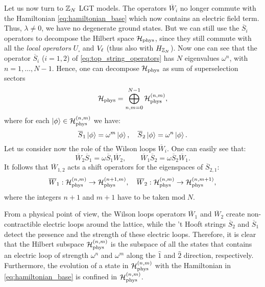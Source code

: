 Let us now turn to $\mathbb{Z}_N$ LGT models.
The operators $\overline{W}_i$ no longer commute with the Hamiltonian \eqref{eq:hamiltonian_base} which now contains an electric field term.
Thus, $\lambda \neq 0$, we have no degenerate ground states.
But we can still use the $\overline{S}_i$ operators to decompose the Hilbert space $\mathcal{H}_{\text{phys}}$, since they still commute with all the \emph{local operators} $U_{\square}$ and $V_{\ell}$ (thus also with $H_{\mathbb{Z}_N}$).
Now one can see that the operator $\overline{S}_i$ ($i=1,2$) of \eqref{eq:top_string_operators} has $N$ eigenvalues $\omega^n$, with $n=1, \dots, N-1$.
Hence, one can decompose $\mathcal{H}_{\text{phys}}$ as sum of superselection sectors
\begin{equation}
    \mathcal{H}_{\text{phys}} = \bigoplus_{n, m=0}^{N-1} \mathcal{H}_{\text{phys}}^{(n, m)},
    \label{eq:decomposizione_Hphys}
\end{equation}
where for each $\ket{\phi} \in \mathcal{H}_{\text{phys}}^{(n, m)}$ we have:
\begin{equation}
    \overline{S}_1 \ket{\phi} = \omega^{m}\ket{\phi}, \quad
    \overline{S}_2 \ket{\phi} = \omega^{n}\ket{\phi}.
\end{equation}
Let us consider now the role of the Wilson loops $\overline{W}_i$.
One can easily see that:
\begin{equation}
    \overline{W}_2 \overline{S}_1 = \omega \overline{S}_1 \overline{W}_2, \qquad
    \overline{W}_1 \overline{S}_2 = \omega \overline{S}_2 \overline{W}_1.
    \label{eq:algebra_op_nonlocali}
\end{equation}
It follows that $\overline{W}_{1,2}$ acts a shift operators for the eigenspaces of $\overline{S}_{2,1}$:
\begin{equation}
    \overline{W}_1 : \mathcal{H}_{\text{phys}}^{(n, m)} \to \mathcal{H}_{\text{phys}}^{(n + 1, m)}, \quad
    \overline{W}_2 : \mathcal{H}_{\text{phys}}^{(n, m)} \to \mathcal{H}_{\text{phys}}^{(n, m + 1)},
    \label{eq:azione_wilson_loop}
\end{equation}
where the integers $n + 1$ and $m + 1$ have to be taken $\mathrm{mod}\; N$.

From a physical point of view, the Wilson loops operators $\overline{W}_1$ and $\overline{W}_2$ create non-contractible electric loops around the lattice, while  the 't Hooft strings $\overline{S}_2$ and $\overline{S}_1$ detect the presence and the strength of these electric loops.
Therefore, it is clear that the Hilbert subspace $\mathcal{H}_{\text{phys}}^{(n, m)}$ is the subspace of all the states that contains an electric loop of strength $\omega^n$ and $\omega^{m}$ along the $\hat{1}$ and $\hat{2}$ direction, respectively.
Furthermore, the evolution of a state in $\mathcal{H}_{\text{phys}}^{(n,m)}$ with the Hamiltonian in \eqref{eq:hamiltonian_base} is confined in $\mathcal{H}_{\text{phys}}^{(n,m)}$.

